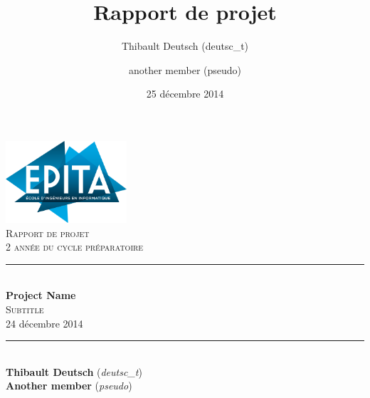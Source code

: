 \documentclass[11pt]{report}
\title{Rapport de projet}
\author{Thibault Deutsch (deutsc\_t) \and another member (pseudo)}
\date{25 décembre 2014}
\begin{document}
\renewcommand{\labelitemi}{$\bullet$}

\begin{titlepage}
\newcommand{\HRule}{\rule{\linewidth}{0.5mm}} %

\flushright
\includegraphics[width = 4.5cm]{epita.png}\\[0.5cm] %

\textsc{\Large Rapport de projet}\\[0.15cm] %
\textsc{\large 2 année du cycle préparatoire}\\[3cm] %

\center
\HRule \\[0.5cm]
{\Huge \bfseries Project Name}\\[0.3cm] %
\textsc{\Large Subtitle}\\[0.1cm] %
\large 24 décembre 2014\\[0.1cm] %
\HRule \\[3cm]

\Large
\textbf{Thibault Deutsch} (\emph{deutsc\_t}) \\
\textbf{Another member} (\emph{pseudo})\\[2cm]

\vfill %

\end{titlepage}
\end{document}
